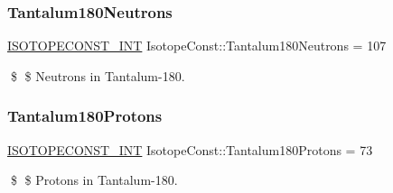 \subsubsection{\texorpdfstring{Tantalum180\+Neutrons}{Tantalum180Neutrons}}
{\footnotesize\ttfamily \mbox{\hyperlink{group___isotope_const-_macros_ga5f18360b3e99483a35c32d789e62621c}{I\+S\+O\+T\+O\+P\+E\+C\+O\+N\+S\+T\+\_\+\+I\+NT}} Isotope\+Const\+::\+Tantalum180\+Neutrons = 107}

\$ \$ Neutrons in Tantalum-\/180. \mbox{\label{group___isotope_const-_tantalum-_ta180_gaa34a06dfb03d4a7668182b73462202e7}} 
\subsubsection{\texorpdfstring{Tantalum180\+Protons}{Tantalum180Protons}}
{\footnotesize\ttfamily \mbox{\hyperlink{group___isotope_const-_macros_ga5f18360b3e99483a35c32d789e62621c}{I\+S\+O\+T\+O\+P\+E\+C\+O\+N\+S\+T\+\_\+\+I\+NT}} Isotope\+Const\+::\+Tantalum180\+Protons = 73}

\$ \$ Protons in Tantalum-\/180. 